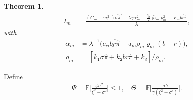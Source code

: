 \documentclass[11pt]{article}
\newtheorem{theorem}{Theorem}[section]
\newcommand \E {\mathbb{E}}
\newcommand \la {\lambda}
\numberwithin{equation}{section}
\begin{document}
\begin{theorem}
\begin{align}
				I_{\scriptscriptstyle m}&=\frac{(C_{\scriptscriptstyle m}-\gamma {c^2_{\scriptscriptstyle m}})\overline{\sigma\widehat{\pi}}^2-\lambda \gamma {\alpha^2_{\scriptscriptstyle m}}+{\frac{\rho_{\scriptscriptstyle m}}{2}\gamma \tilde{a}_{\scriptscriptstyle m}\varrho^2_{\scriptscriptstyle m}}+F_{\scriptscriptstyle m}\overline{\underline{br}\widehat{\pi}}}{\lambda},
			\end{align}
			with
			\begin{align}
				\alpha_{\scriptscriptstyle m}&=\la^{-1}\big({c_{\scriptscriptstyle m}\overline{\underline{br}\widehat{\pi}}+a_{\scriptscriptstyle m}\rho_{\scriptscriptstyle m} \varrho_{\scriptscriptstyle m}(b-r)}\big), \label{eq:MFe1}\\
				\varrho_{\scriptscriptstyle m}&={\left[k_1\overline{\sigma\widehat{\pi}}+k_2\overline{\underline{br}\widehat{\pi}}+k_3\right]/\rho_{\scriptscriptstyle m}}.
			\end{align}
	\end{theorem}

	Define
	\begin{align}\label{eq:MFPsi}
		\Psi=\E\Big[\frac{\phi\sigma^2}{\xi^2+\sigma^2}\Big] \le 1,\quad  {\Theta=\E\Big[\frac{\sigma b}{\gamma(\xi^2+\sigma^2)}\Big]}.
	\end{align}
	
	
	
\end{document}
